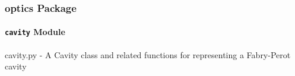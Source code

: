 \documentclass[letterpaper,10pt,english]{sphinxmanual}
\begin{document}

\begin{fulllineitems}
\label{api/gtrace.draw:gtrace.draw.tools.drawOptSys}
\end{fulllineitems}


\begin{fulllineitems}
\label{api/gtrace.draw:gtrace.draw.tools.rotateAll}
\end{fulllineitems}


\begin{fulllineitems}
\label{api/gtrace.draw:gtrace.draw.tools.transAll}
\end{fulllineitems}



\subsubsection{optics Package}
\label{api/gtrace.optics:optics-package}\label{api/gtrace.optics::doc}

\paragraph{\texttt{cavity} Module}
\label{api/gtrace.optics:module-gtrace.optics.cavity}\label{api/gtrace.optics:cavity-module}
cavity.py - A Cavity class and related functions for representing a Fabry-Perot cavity
\end{document}
